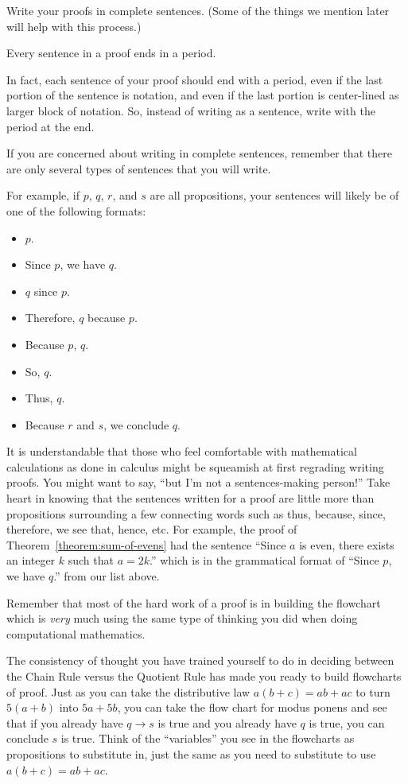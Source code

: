\documentclass{book}
\theoremstyle{ekimcustom}
\begin{document}
\begin{bhabit}{}{}
Write your proofs in complete sentences. (Some of the things we mention later will help with this process.)
\end{bhabit}

\begin{bhabit}{}{}
Every sentence in a proof ends in a period.
\end{bhabit}
In fact, each sentence of your proof should end with a period, even if the last portion of the sentence is notation, and even if the last portion is center-lined as larger block of notation. So, instead of writing  as a sentence, write  with the period at the end.

\begin{bhabit}{}{}
If you are concerned about writing in complete sentences, remember that there are only several types of sentences that you will write.
\end{bhabit}
For example, if $p$, $q$, $r$, and $s$ are all propositions, your sentences will likely be of one of the following formats:
\begin{itemize}
\item $p$.
\item Since $p$, we have $q$. %
\item $q$ since $p$. %
\item Therefore, $q$ because $p$.
\item Because $p$,\,\,$q$.
\item So, $q$.
\item Thus, $q$.
\item Because $r$ and $s$, we conclude $q$.
\end{itemize}
It is understandable that those who feel comfortable with mathematical calculations as done in calculus might be squeamish at first regrading writing proofs. You might want to say, ``but I'm not a sentences-making person!'' Take heart in knowing that the sentences written for a proof are little more than propositions surrounding a few connecting words such as thus, because, since, therefore, we see that, hence, etc. For example, the proof of Theorem~\ref{theorem:sum-of-evens} had the sentence ``Since $a$ is even, there exists an integer $k$ such that $a=2k$.'' which is in the grammatical format of ``Since $p$, we have $q$.'' from our list above.


\begin{bhabit}{}{}
Remember that most of the hard work of a proof is in building the flowchart which is \emph{very} much using the same type of thinking you did when doing computational mathematics.
\end{bhabit}
The consistency of thought you have trained yourself to do in deciding between the Chain Rule versus the Quotient Rule has made you ready to build flowcharts of proof. Just as you can take the distributive law $a(b+c)=ab+ac$ to turn $5(a+b)$ into $5a+5b$, you can take the flow chart for modus ponens and see that if you already have $q \rightarrow s$ is true and you already have $q$ is true, you can conclude $s$ is true. Think of the ``variables'' you see in the flowcharts as propositions to substitute in, just the same as you need to substitute to use $a(b+c)=ab+ac$.
\end{document}
